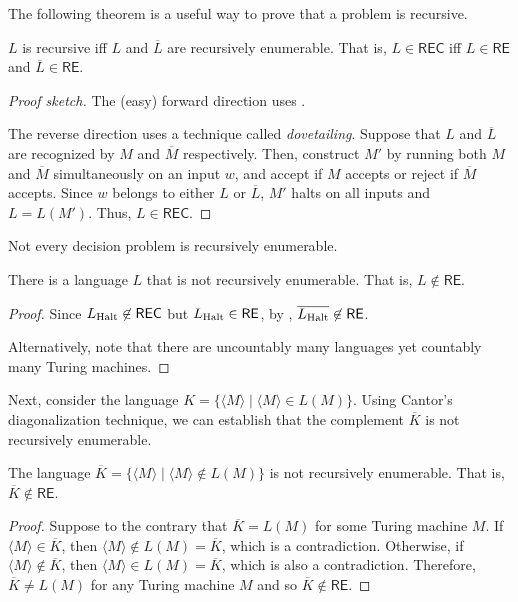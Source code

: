 \documentclass[11pt,usenames, dvipsnames]{article}
\begin{document}
The following theorem is a useful way to prove that a problem is recursive.

\begin{theorem}
  $L$ is recursive iff $L$ and $\overline{L}$ are recursively enumerable. That is, $L \in \textsf{REC}$ iff $L \in \textsf{RE}$ and $\overline{L} \in \textsf{RE}$.
\end{theorem}

\begin{proof}[Proof sketch]
  The (easy) forward direction uses .
  
  The reverse direction uses a technique called \emph{dovetailing}. Suppose that $L$ and $\overline{L}$ are recognized by $M$ and $\overline{M}$ respectively. Then, construct $M'$ by running both $M$ and $\overline{M}$ simultaneously on an input $w$, and accept if $M$ accepts or reject if $\overline{M}$ accepts. Since $w$ belongs to either $L$ or $\overline{L}$, $M'$ halts on all inputs and $L = L(M')$. Thus, $L \in \textsf{REC}$.
\end{proof}

Not every decision problem is recursively enumerable.

\begin{theorem}
  There is a language $L$ that is not recursively enumerable. That is, $L \not\in \textsf{RE}$.
\end{theorem}

\begin{proof}
  Since $L\textsubscript{Halt} \not\in \textsf{REC}$ but $L\textsubscript{Halt} \in \textsf{RE}$, by , $\overline{L\textsubscript{Halt}} \not\in \textsf{RE}$.

  Alternatively, note that there are uncountably many languages yet countably many Turing machines.
\end{proof}

Next, consider the language $K = \{\langle M \rangle \mid \langle M \rangle \in L(M)\}$. Using Cantor's diagonalization technique, we can establish that the complement $\overline{K}$ is not recursively enumerable.

\begin{theorem}
  The language $\overline{K} = \{\langle M \rangle \mid \langle M \rangle \not\in L(M)\}$ is not recursively enumerable. That is, $\overline{K} \notin \textsf{RE}$.
\end{theorem}

\begin{proof}
  Suppose to the contrary that $\overline{K} = L(M)$ for some Turing machine $M$. If $\langle M \rangle \in \overline{K}$, then $\langle M \rangle \not\in L(M) = \overline{K}$, which is a contradiction. Otherwise, if $\langle M \rangle \not\in \overline{K}$, then $\langle M \rangle \in L(M) = \overline{K}$, which is also a contradiction. Therefore, $\overline{K} \ne L(M)$ for any Turing machine $M$ and so $\overline{K} \notin \textsf{RE}$.
\end{proof}
\end{document}
